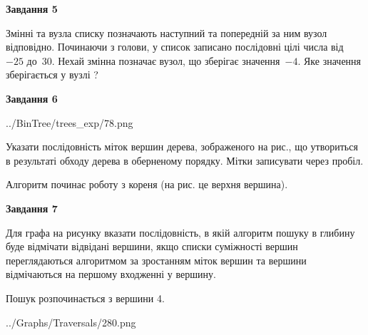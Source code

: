 \documentclass[12pt, ukrainian]{article}
\begin{document}
{\begin {large}
{\begin {center}\textbf{Завдання 5}\end {center}}\par
Змінні  та  вузла списку позначають наступний та попередній за ним вузол відповідно. Починаючи з голови, у список записано послідовні цілі числа від~$-25$ до~$30$. Нехай змінна  позначає вузол, що зберігає значення~$-4$.
Яке значення зберігається у вузлі  ?\par
\newpage

{\begin {center}\textbf{Завдання 6}\end {center}}\par

\begin{center}
	{../BinTree/trees_exp/78.png}
\end{center}
Указати послідовність міток вершин дерева, зображеного на рис., що утвориться в результаті обходу дерева в оберненому порядку. Мітки записувати через пробіл.\par Алгоритм починає роботу з кореня (на рис. це верхня вершина).\par
\newpage

{\begin {center}\textbf{Завдання 7}\end {center}}\par
Для графа на рисунку вказати послідовність, в якій алгоритм пошуку в глибину буде відмічати відвідані вершини, якщо списки суміжності вершин переглядаються алгоритмом за зростанням міток вершин та вершини відмічаються на першому вход\-женні у вершину.\par
Пошук розпочинається з вершини 4.\par

\begin{center}
	{../Graphs/Traversals/280.png}
\end{center}\par
\newpage


\end{large}}
\end{document}
